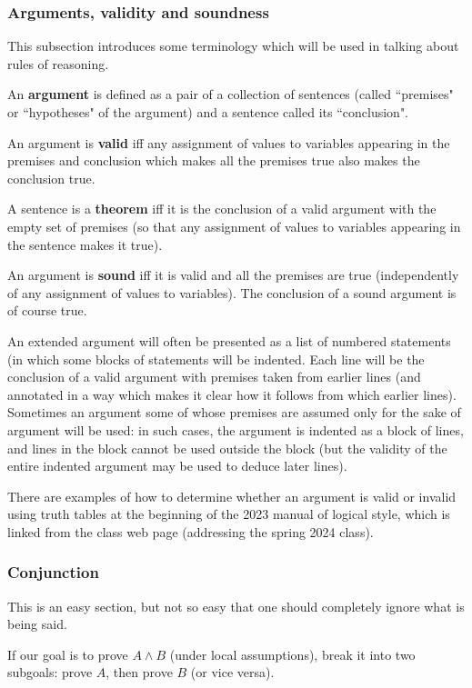 \documentclass[12pt]{article}
\begin{document}
\subsubsection{Arguments, validity and soundness}

This subsection introduces some terminology which will be used in talking about rules of reasoning.

An {\bf argument} is defined as a pair of a collection of sentences (called ``premises"  or ``hypotheses" of the argument) and a sentence called its ``conclusion".

An argument is {\bf valid} iff any assignment of values to variables appearing in the premises and conclusion which makes all the premises true also makes the conclusion true.

A sentence is a {\bf theorem} iff it is the conclusion of a valid argument with the empty set of premises (so that any assignment of values to variables appearing in the sentence makes it true).

An argument is {\bf sound} iff it is valid and all the premises are true (independently of any assignment of values to variables).  The conclusion of a sound argument is of course true.

An extended argument will often be presented as a list of numbered statements (in which some blocks of statements will be indented.  Each line will be the conclusion of a valid
argument with premises taken from earlier lines (and annotated in a way which makes it clear how it follows from which earlier lines).   Sometimes an argument some of whose
premises are assumed only for the sake of argument will be used:  in such cases, the argument is indented as a block of lines, and lines in the block cannot be used outside the block (but the validity of the entire indented argument may be used to deduce later lines).

There are examples of how to determine whether an argument is valid or invalid using truth tables at the beginning of the 2023 manual of logical style, which is linked from the class web page (addressing the spring 2024 class).

\subsubsection{Conjunction}

This is an easy section, but not so easy that one should completely
ignore what is being said.

If our goal is to prove $A \wedge B$ (under local assumptions), break
it into two subgoals: prove $A$, then prove $B$ (or vice versa).
\end{document}

